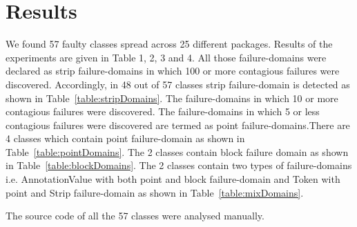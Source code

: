 \documentclass[runningheads,a4paper]{llncs}
\begin{document}
\section{Results}
We found 57 faulty classes spread across 25 different packages. Results of the experiments are given in Table 1, 2, 3 and 4. All those failure-domains were declared as strip failure-domains in which 100 or more contagious failures were discovered. Accordingly, in 48 out of 57 classes strip failure-domain is detected as shown in Table~\ref{table:stripDomains}. The failure-domains in which 10 or more contagious failures were discovered. The failure-domains in which 5 or less contagious failures were discovered are termed as point failure-domains.There are 4 classes which contain point failure-domain as shown in Table~\ref{table:pointDomains}. The 2 classes contain block failure domain as shown in Table~\ref{table:blockDomains}. The 2 classes contain two types of failure-domains i.e. AnnotationValue with both point and block failure-domain and Token with point and Strip failure-domain as shown in Table~\ref{table:mixDomains}.

The source code of all the 57 classes were analysed manually.


\end{document}
